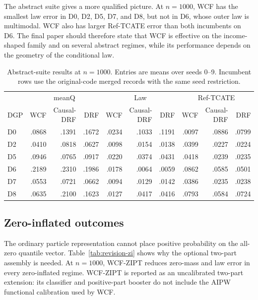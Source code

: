 The abstract suite gives a more qualified picture. At $n=1000$, WCF has the
smallest law error in D0, D2, D5, D7, and D8, but not in D6, whose outer law
is multimodal. WCF also has larger Ref-TCATE error than both incumbents on
D6. The final paper should therefore state that WCF is effective on the
income-shaped family and on several abstract regimes, while its performance
depends on the geometry of the conditional law.

\begin{table}[t]
\centering\scriptsize
\caption{Abstract-suite results at $n=1000$. Entries are means over seeds
0--9. Incumbent rows use the original-code merged records with the same seed
restriction.}
\label{tab:revision-abstract}
\begin{tabular}{lrrrrrrrrr}
\toprule
 & \multicolumn{3}{c}{meanQ} & \multicolumn{3}{c}{Law} &
 \multicolumn{3}{c}{Ref-TCATE}\\
DGP & WCF & Causal-DRF & DRF & WCF & Causal-DRF & DRF &
 WCF & Causal-DRF & DRF\\
\midrule
D0 & .0868 & .1391 & .1672 & .0234 & .1033 & .1191 & .0097 & .0886 & .0799\\
D2 & .0410 & .0818 & .0627 & .0098 & .0154 & .0138 & .0399 & .0227 & .0224\\
D5 & .0946 & .0765 & .0917 & .0220 & .0374 & .0431 & .0418 & .0239 & .0235\\
D6 & .2189 & .2310 & .1986 & .0178 & .0064 & .0059 & .0862 & .0585 & .0501\\
D7 & .0553 & .0721 & .0662 & .0094 & .0129 & .0142 & .0386 & .0235 & .0238\\
D8 & .0635 & .2100 & .1623 & .0127 & .0417 & .0416 & .0793 & .0584 & .0724\\
\bottomrule
\end{tabular}
\end{table}

\subsection{Zero-inflated outcomes}

The ordinary particle representation cannot place positive probability on the
all-zero quantile vector. Table~\ref{tab:revision-zi} shows why the optional
two-part assembly is needed. At $n=1000$, WCF-ZIPT reduces zero-mass and law
error in every zero-inflated regime. WCF-ZIPT is reported as an uncalibrated
two-part extension: its classifier and positive-part booster do not include
the AIPW functional calibration used by WCF.

